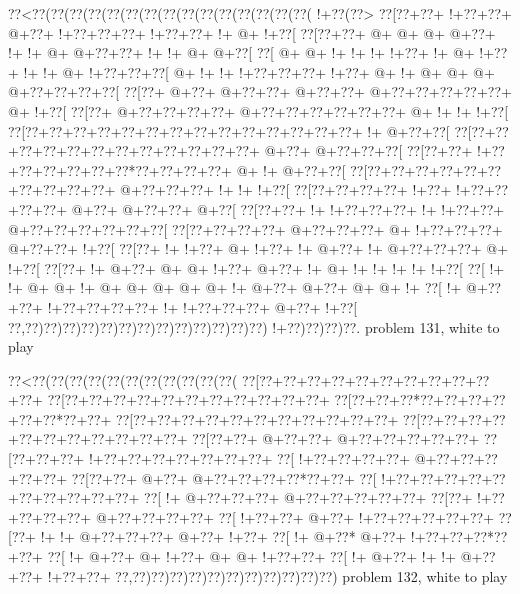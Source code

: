 \vbox{\vbox{\goo
\0??<\0??(\0??(\0??(\0??(\0??(\0??(\0??(\0??(\0??(\0??(\0??(\0??(\0??(\0??(\0??(\- !+\0??(\0??>
\0??[\0??+\0??+\- !+\0??+\0??+\- @+\0??+\- !+\0??+\0??+\0??+\- !+\0??+\0??+\- !+\- @+\- !+\0??[
\0??[\0??+\0??+\- @+\- @+\- @+\- @+\0??+\- !+\- !+\- @+\- @+\0??+\0??+\- !+\- !+\- @+\- @+\0??[
\0??[\- @+\- @+\- !+\- !+\- !+\- !+\0??+\- !+\- @+\- !+\0??+\- !+\- !+\- @+\- !+\0??+\0??+\0??[
\- @+\- !+\- !+\- !+\0??+\0??+\0??+\- !+\0??+\- @+\- !+\- @+\- @+\- @+\- @+\0??+\0??+\0??+\0??[
\0??[\0??+\- @+\0??+\- @+\0??+\0??+\- @+\0??+\0??+\- @+\0??+\0??+\0??+\0??+\0??+\- @+\- !+\0??[
\0??[\0??+\- @+\0??+\0??+\0??+\0??+\- @+\0??+\0??+\0??+\0??+\0??+\0??+\- @+\- !+\- !+\- !+\0??[
\0??[\0??+\0??+\0??+\0??+\0??+\0??+\0??+\0??+\0??+\0??+\0??+\0??+\0??+\0??+\- !+\- @+\0??+\0??[
\0??[\0??+\0??+\0??+\0??+\0??+\0??+\0??+\0??+\0??+\0??+\0??+\0??+\- @+\0??+\- @+\0??+\0??+\0??[
\0??[\0??+\0??+\- !+\0??+\0??+\0??+\0??+\0??+\0??*\0??+\0??+\0??+\0??+\- @+\- !+\- @+\0??+\0??[
\0??[\0??+\0??+\0??+\0??+\0??+\0??+\0??+\0??+\0??+\0??+\- @+\0??+\0??+\0??+\- !+\- !+\- !+\0??[
\0??[\0??+\0??+\0??+\0??+\- !+\0??+\- !+\0??+\0??+\0??+\0??+\- @+\0??+\- @+\0??+\0??+\- @+\0??[
\0??[\0??+\0??+\- !+\- !+\0??+\0??+\0??+\- !+\- !+\0??+\0??+\- @+\0??+\0??+\0??+\0??+\0??+\0??[
\0??[\0??+\0??+\0??+\0??+\- @+\0??+\0??+\0??+\- @+\- !+\0??+\0??+\0??+\- @+\0??+\0??+\- !+\0??[
\0??[\0??+\- !+\- !+\0??+\- @+\- !+\0??+\- !+\- @+\0??+\- !+\- @+\0??+\0??+\0??+\- @+\- !+\0??[
\0??[\0??+\- !+\- @+\0??+\- @+\- @+\- !+\0??+\- @+\0??+\- !+\- @+\- !+\- !+\- !+\- !+\- !+\0??[
\0??[\- !+\- !+\- @+\- @+\- !+\- @+\- @+\- @+\- @+\- @+\- !+\- @+\0??+\- @+\0??+\- @+\- @+\- !+
\0??[\- !+\- @+\0??+\0??+\- !+\0??+\0??+\0??+\0??+\- !+\- !+\0??+\0??+\0??+\- @+\0??+\- !+\0??[
\0??,\0??)\0??)\0??)\0??)\0??)\0??)\0??)\0??)\0??)\0??)\0??)\0??)\0??)\- !+\0??)\0??)\0??)\0??.
}
\hfil problem 131, white to play\hfil\break
}

\vbox{\vbox{\goo
\0??<\0??(\0??(\0??(\0??(\0??(\0??(\0??(\0??(\0??(\0??(\0??(
\0??[\0??+\0??+\0??+\0??+\0??+\0??+\0??+\0??+\0??+\0??+\0??+
\0??[\0??+\0??+\0??+\0??+\0??+\0??+\0??+\0??+\0??+\0??+\0??+
\0??[\0??+\0??+\0??*\0??+\0??+\0??+\0??+\0??+\0??*\0??+\0??+
\0??[\0??+\0??+\0??+\0??+\0??+\0??+\0??+\0??+\0??+\0??+\0??+
\0??[\0??+\0??+\0??+\0??+\0??+\0??+\0??+\0??+\0??+\0??+\0??+
\0??[\0??+\0??+\- @+\0??+\0??+\- @+\0??+\0??+\0??+\0??+\0??+
\0??[\0??+\0??+\0??+\- !+\0??+\0??+\0??+\0??+\0??+\0??+\0??+
\0??[\- !+\0??+\0??+\0??+\0??+\- @+\0??+\0??+\0??+\0??+\0??+
\0??[\0??+\0??+\- @+\0??+\- @+\0??+\0??+\0??+\0??*\0??+\0??+
\0??[\- !+\0??+\0??+\0??+\0??+\0??+\0??+\0??+\0??+\0??+\0??+
\0??[\- !+\- @+\0??+\0??+\0??+\- @+\0??+\0??+\0??+\0??+\0??+
\0??[\0??+\- !+\0??+\0??+\0??+\0??+\- @+\0??+\0??+\0??+\0??+
\0??[\- !+\0??+\0??+\- @+\0??+\- !+\0??+\0??+\0??+\0??+\0??+
\0??[\0??+\- !+\- !+\- @+\0??+\0??+\0??+\- @+\0??+\- !+\0??+
\0??[\- !+\- @+\0??*\- @+\0??+\- !+\0??+\0??+\0??*\0??+\0??+
\0??[\- !+\- @+\0??+\- @+\- !+\0??+\- @+\- @+\- !+\0??+\0??+
\0??[\- !+\- @+\0??+\- !+\- !+\- @+\0??+\0??+\- !+\0??+\0??+
\0??,\0??)\0??)\0??)\0??)\0??)\0??)\0??)\0??)\0??)\0??)\0??)
}
\hfil problem 132, white to play\hfil\break
}


